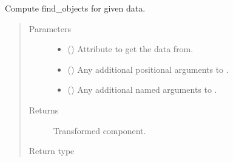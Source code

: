\documentclass[letterpaper,10pt,english]{sphinxmanual}
\begin{document}
\begin{fulllineitems}
\begin{fulllineitems}
\label{\detokenize{api/base_classes:geology.src.base_spatial.SpatialComponent.find_objects}}
Compute find\_objects for given data.
\begin{quote}\begin{description}
\item[{Parameters}] \leavevmode\begin{itemize}
\item {} 
 (\sphinxstyleliteralemphasis{\sphinxupquote{, }}) \textendash{} Attribute to get the data from.

\item {} 
 () \textendash{} Any additional positional arguments to .

\item {} 
 () \textendash{} Any additional named arguments to .

\end{itemize}

\item[{Returns}] \leavevmode
{} \textendash{} Transformed component.

\item[{Return type}] \leavevmode
{\hyperref[\detokenize{api/base_classes:geology.src.base_spatial.SpatialComponent}]{}}

\end{description}\end{quote}

\end{fulllineitems}



\end{fulllineitems}
\end{document}
